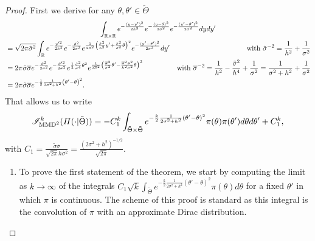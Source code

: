 \begin{proof}
    First we derive for any $\theta,\theta'\in\tilde\Theta$
            \begin{multline}
                \int_{\mathbb{R}\times\mathbb{R}} e^{-\frac{(y-y')^2}{2h^2}} e^{-\frac{(y-\theta)^2}{2\sigma^2} } e^{-\frac{(y'-\theta')^2}{2\sigma^2} }  d yd y' 
                    \\
                    \begin{aligned}
                        &= \sqrt{2\pi\tilde\sigma^2}\int_{\mathbb{R}} e^{-\frac{y'^2}{2h^2}}e^{-\frac{\theta^2}{2\sigma^2}} e^{\frac{1}{2\tilde\sigma^2}\left( \frac{\tilde\sigma^2}{h^2}y'+\frac{\tilde\sigma^2}{\sigma^2}\theta \right)^2} e^{-\frac{(y'-\theta')^2}{2\sigma^2}}dy'
                        &\mbox{with }\tilde\sigma^{-2}=\frac{1}{h^2}+\frac{1}{\sigma^2}\\
                    & = 2\pi\tilde\sigma\overline\sigma
                    e^{-\frac{\theta^2}{2\sigma^2}} e^{-\frac{\theta'^2}{2\sigma^2}} e^{\frac{1}{2}\frac{\tilde\sigma^2}{\sigma^4}\theta^2} e^{\frac{1}{2\overline\sigma^2}\left(\frac{\overline\sigma^2}{\sigma^2}\theta' - \frac{\overline\sigma^2\tilde\sigma^2}{h^2\sigma^2}\theta\right)^2} 
                        &\mbox{with }\overline\sigma^{-2}= \frac{1}{h^2} - \frac{\tilde\sigma^2}{h^4} + \frac{1}{\sigma^2} = \frac{1}{\sigma^2+h^2}+\frac{1}{\sigma^2}\\
                    &= 2\pi\tilde\sigma\overline\sigma e^{-\frac{1}{2}\frac{1}{2\sigma^2+h^2}\left(\theta' - \theta\right)^2}. 
                    \end{aligned}
            \end{multline}
        That allows us to write
    \begin{equation}\label{eq:PSGSA:expr2IMMD}
        \mathscr{I}_{\text{MMD}^2}^k(\varPi(\cdot|\tilde\Theta)) = - C_1^k\int_{\tilde\Theta\times\tilde\Theta} e^{-\frac{k}{2}\frac{1}{2\sigma^2+h^2}(\theta'-\theta)^2}\pi(\theta)\pi(\theta')d\theta d\theta' + C_1^k,
    \end{equation}
with $C_1=\frac{\tilde\sigma\overline{\sigma}}{\sqrt{2\pi}h\sigma^2} = \frac{(2\sigma^2+h^2)^{-1/2}}{\sqrt{2\pi}}$. %
 \begin{enumerate}
    \item To prove the first statement of the theorem, 
    we start by  computing the limit as $k\to\infty$ of the integrals  $C_1\sqrt{k}\int_{\tilde\Theta}e^{-\frac{k}{2}\frac{1}{2\sigma^2+h^2}(\theta'-\theta)^2}\pi(\theta)d\theta $ for a fixed $\theta'$ in which $\pi$ is continuous. The scheme of this proof is standard as this integral is the convolution of  $\pi$ with an approximate Dirac distribution. %

\end{enumerate}
\end{proof}
